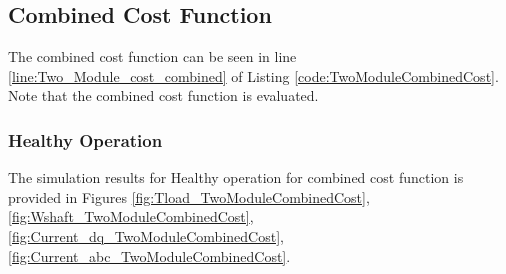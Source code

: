 \documentclass{article}
\begin{document}
\subsection{Combined Cost Function}
The combined cost function can be seen in line \ref{line:Two_Module_cost_combined} of Listing \ref{code:TwoModuleCombinedCost}. Note that the combined cost function is evaluated.

\subsubsection{Healthy Operation}
The simulation results for Healthy operation for combined cost function is provided in Figures \ref{fig:Tload_TwoModuleCombinedCost}, \ref{fig:Wshaft_TwoModuleCombinedCost}, \ref{fig:Current_dq_TwoModuleCombinedCost}, \ref{fig:Current_abc_TwoModuleCombinedCost}.
\end{document}
